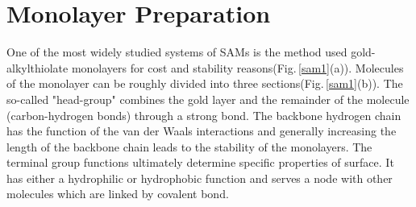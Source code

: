 \section{Monolayer Preparation}

One of the most widely studied systems of SAMs is the method used gold-alkylthiolate monolayers for cost and stability reasons(Fig.\,\ref{sam1}(a)).
Molecules of the monolayer can be roughly divided into three sections(Fig.\,\ref{sam1}(b)). The so-called "head-group" combines the gold layer and the remainder of the molecule (carbon-hydrogen bonds) through a strong bond. The backbone hydrogen chain has the function of the van der Waals interactions and generally increasing the length of the backbone chain leads to the stability of the monolayers.
The terminal group functions ultimately determine specific properties of surface. It has either a hydrophilic or hydrophobic function and serves a node with other molecules which are linked by covalent bond.



